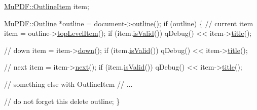 \begin{DoxyCode}
\hyperlink{class_mu_p_d_f_1_1_outline_item}{MuPDF::OutlineItem} item;

\hyperlink{class_mu_p_d_f_1_1_outline}{MuPDF::Outline} *outline = document->\hyperlink{class_mu_p_d_f_1_1_document_a0ea90d9e549fafa6b33dd6d1eca603e6}{outline}();
\textcolor{keywordflow}{if} (outline) \{
    \textcolor{comment}{// current item}
    item = outline->\hyperlink{class_mu_p_d_f_1_1_outline_a5cb3d15517c68bed0486cd7a2a06c5db}{topLevelItem}();
    \textcolor{keywordflow}{if} (item.\hyperlink{class_mu_p_d_f_1_1_outline_item_a0f8f4d3f59da951e5a9f4d467846d97f}{isValid}())
        qDebug() << item->\hyperlink{class_mu_p_d_f_1_1_outline_item_a39279fb107effca0ee53f0931d06260d}{title}();

    \textcolor{comment}{// down}
    item = item->\hyperlink{class_mu_p_d_f_1_1_outline_item_a3d74fe1a6ed39127f8326a8cfb4205f3}{down}();
    \textcolor{keywordflow}{if} (item.\hyperlink{class_mu_p_d_f_1_1_outline_item_a0f8f4d3f59da951e5a9f4d467846d97f}{isValid}())
        qDebug() << item->\hyperlink{class_mu_p_d_f_1_1_outline_item_a39279fb107effca0ee53f0931d06260d}{title}();

    \textcolor{comment}{// next}
    item = item->\hyperlink{class_mu_p_d_f_1_1_outline_item_aac4d96f572743aab40916b45861ca914}{next}();
    \textcolor{keywordflow}{if} (item.\hyperlink{class_mu_p_d_f_1_1_outline_item_a0f8f4d3f59da951e5a9f4d467846d97f}{isValid}())
        qDebug() << item->\hyperlink{class_mu_p_d_f_1_1_outline_item_a39279fb107effca0ee53f0931d06260d}{title}();

    \textcolor{comment}{// something else with OutlineItem}
    \textcolor{comment}{// ...}

    \textcolor{comment}{// do not forget this}
    \textcolor{keyword}{delete} outline;
\}
\end{DoxyCode}
 
